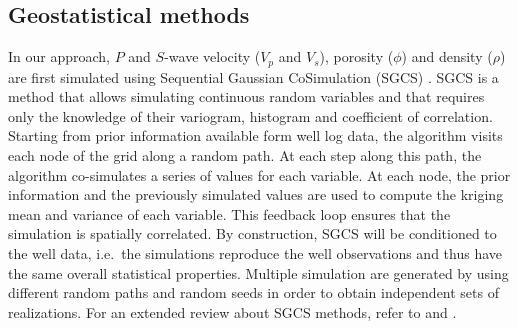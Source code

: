 \subsection{Geostatistical methods}
In our approach, $P$ and $S$-wave velocity ($V_p$ and $V_s$), porosity ($\phi$)
and density ($\rho$) are first simulated using Sequential Gaussian CoSimulation
(SGCS) \citep{Deutsch1998,Doyen2007}. SGCS is a method that allows simulating
continuous random variables and that requires only the knowledge of their
variogram, histogram and coefficient of correlation. Starting from prior
information available form well log data, the algorithm visits each node of the
grid along a random path. At each step along this path, the algorithm
co-simulates a series of values for each variable. At each node, the prior
information and the previously simulated values are used to compute the kriging
mean and variance of each variable. This feedback loop ensures that the
simulation is spatially correlated. By construction, SGCS  will be conditioned
to the well data, i.e.\ the simulations reproduce the well observations and thus
have the same overall statistical properties. Multiple simulation are generated
by using different random paths and random seeds in order to obtain independent
sets of realizations. For an extended review about SGCS methods, refer to
\citet{Deutsch1998} and \citet{Doyen2007}.
